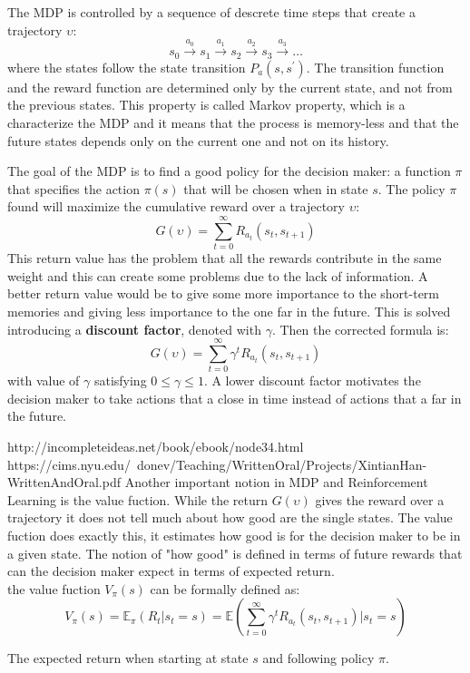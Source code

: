 \documentclass[14pt]{extarticle}
\def\ppn{\vspace{10pt}}
\begin{document}
\begin{flushleft}
\ppn
The MDP is controlled by a sequence of descrete time steps that create a trajectory $\upsilon$:
\[s_0 \xrightarrow{a_0} s_1 \xrightarrow{a_1} s_2 \xrightarrow{a_2} s_3 \xrightarrow{a_3} \dotso\]
where the states follow the state transition $P_a(s,s^\prime)$. The transition function and the reward function are determined only by the current state, and not from the previous states. This property is called Markov property, which is a characterize the MDP and it means that the process is memory-less and that the future states depends only on the current one and not on its history.

\ppn
The goal of the MDP is to find a good policy for the decision maker: a function $\pi$ that specifies the action $\pi(s)$ that will be chosen when in state $s$. The policy $\pi$ found will maximize the cumulative reward over a trajectory $\upsilon$:
\[ G(\upsilon) = \sum_{t=0}^{\infty} R_{a_t}(s_t, s_{t+1}) \] 
This return value has the problem that all the rewards contribute in the same weight and this can create some problems due to the lack of information. A better return value would be to give some more importance to the short-term memories and giving less importance to the one far in the future. This is solved introducing a \textbf{discount factor}, denoted with $\gamma$. Then the corrected formula is:
\[ G(\upsilon) = \sum_{t=0}^{\infty} \gamma^t R_{a_t}(s_t, s_{t+1}) \]
with value of $\gamma$ satisfying $ 0 \leq \gamma \leq 1$. A lower discount factor motivates the decision maker to take actions that a close in time instead of actions that a far in the future.

\ppn
http://incompleteideas.net/book/ebook/node34.html
https://cims.nyu.edu/~donev/Teaching/WrittenOral/Projects/XintianHan-WrittenAndOral.pdf
Another important notion in MDP and Reinforcement Learning is the value fuction. While the return $G(\upsilon)$ gives the reward over a trajectory it does not tell much about how good are the single states. The value fuction does exactly this, it estimates how good is for the decision maker to be in a given state. The notion of "how good" is defined in terms of future rewards that can the decision maker expect in terms of expected return.
\\
the value fuction $V_{\pi}(s)$ can be formally defined as: 
\[V_{\pi}(s) = \mathbb{E}_{\pi}(R_t|s_t=s) = \mathbb{E}(\sum_{t=0}^{\infty} \gamma^t R_{a_t}(s_t, s_{t+1})|s_t=s)\]
\vspace{-9.3mm}
\begin{center}
The expected return when starting at state $s$ and following policy $\pi$.
\end{center}


\end{flushleft}
\end{document}
